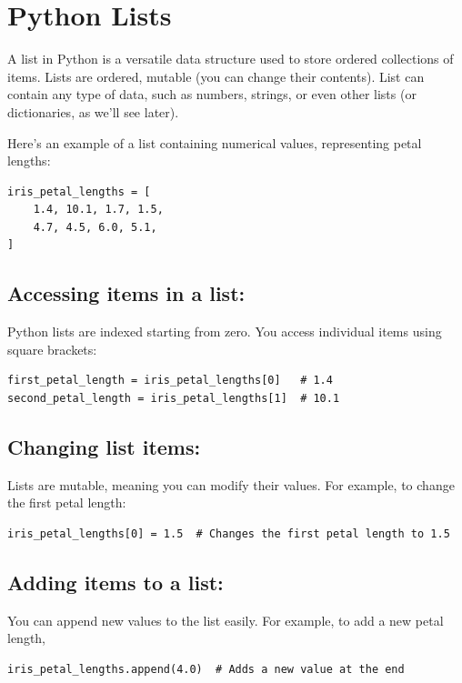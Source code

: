 \section{Python Lists}

A list in Python is a versatile data structure used to store ordered collections of items. Lists are ordered, mutable (you can change their contents). List can contain any type of data, such as numbers, strings, or even other lists (or dictionaries, as we'll see later).

Here's an example of a list containing numerical values, representing petal lengths:

\begin{verbatim}
iris_petal_lengths = [
    1.4, 10.1, 1.7, 1.5,
    4.7, 4.5, 6.0, 5.1,
]
\end{verbatim}

\subsection{Accessing items in a list:} Python lists are indexed starting from zero. You access individual items using square brackets:
\begin{verbatim}
first_petal_length = iris_petal_lengths[0]   # 1.4
second_petal_length = iris_petal_lengths[1]  # 10.1
\end{verbatim}

\subsection{Changing list items:} 
Lists are mutable, meaning you can modify their values. For example, to change the first petal length:
\begin{verbatim}
iris_petal_lengths[0] = 1.5  # Changes the first petal length to 1.5
\end{verbatim}

\subsection{Adding items to a list:} 
You can append new values to the list easily. For example, to add a new petal length,
\begin{verbatim}
iris_petal_lengths.append(4.0)  # Adds a new value at the end
\end{verbatim}

